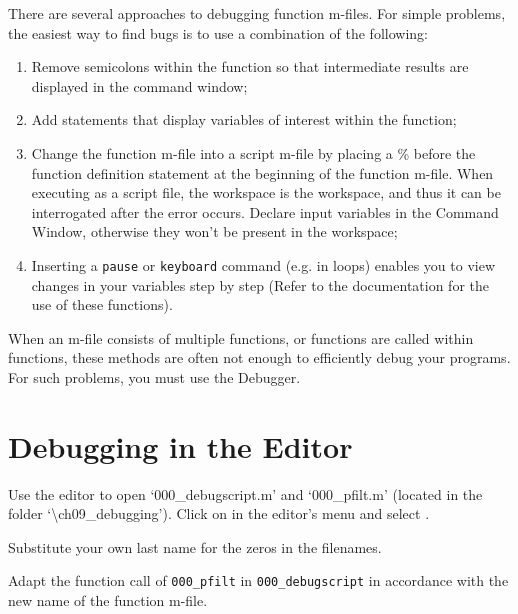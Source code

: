 There are several approaches to debugging function m-files. For simple problems, the easiest way to find bugs is to use a combination of the following:

\begin{enumerate}
\item {Remove semicolons within the function so that intermediate results are displayed in the command window;}
\item {Add statements that display variables of interest within the function;}
\item {Change the function m-file into a script m-file by placing a \% before the function definition statement at the beginning of the function m-file. When executing as a script file, the workspace is the \MATLAB{} workspace, and thus it can be interrogated after the error occurs. Declare input variables in the Command Window, otherwise they won't be present in the workspace;}
\item {Inserting a {\tt pause} or {\tt keyboard} command (e.g. in loops) enables you to view changes in your variables step by step (Refer to the documentation for the use of these functions).}
\end{enumerate}

\noindent When an m-file consists of multiple functions, or functions are called within functions, these methods are often not enough to efficiently debug your programs. For such problems, you must use the \MATLAB{} Debugger.


\section{Debugging in the Editor}
\begin{action}
Use the editor to open `000\_debugscript.m' and `000\_pfilt.m' (located in the folder `\textbackslash{}ch09\_debugging'). Click on  in the editor's menu and select .
\end{action}


\begin{action}
Substitute your own last name for the zeros in the filenames.
\end{action} 

\begin{action}
Adapt the function call of {\tt 000\_pfilt} in {\tt 000\_debugscript} in accordance with the new name of the function m-file.
\end{action}


